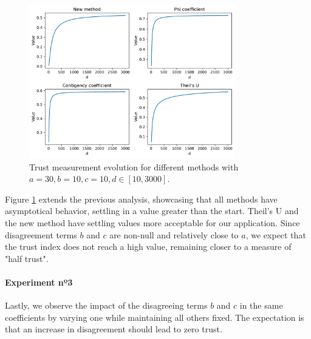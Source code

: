 \begin{figure}[h!]
\centering
    \includegraphics[width=0.8\textwidth]{figures/chapter4/cell/trust_tests/1_b.pdf}
    \caption{Trust measurement evolution for different methods with $a=30, b=10, c=10, d \in [10, 3000]$.}
    \label{fig:trust_test_1_b}
\end{figure}
\FloatBarrier

Figure \ref{fig:trust_test_1_b} extends the previous analysis, showcasing that all methods have asymptotical behavior, settling in a value greater than the start. Theil's U and the new method have settling values more acceptable for our application. Since disagreement terms $b$ and $c$ are non-null and relatively close to $a$, we expect that the trust index does not reach a high value, remaining closer to a measure of "half trust".

\paragraph{Experiment nº3} Lastly, we observe the impact of the disagreeing terms $b$ and $c$ in the same coefficients by varying one while maintaining all others fixed. The expectation is that an increase in disagreement should lead to zero trust.


